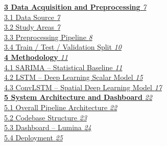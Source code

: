 \documentclass[12pt,a4paper]{report}
\begin{document}
\hyperlink{sec:ch3}{\textbf{3 \hspace{0.3cm} Data Acquisition and Preprocessing} \dotfill \textit{7}}\\
\hspace*{0.8cm}\hyperlink{sec:s31}{3.1 \hspace{0.3cm} Data Source \dotfill \textit{7}}\\
\hspace*{0.8cm}\hyperlink{sec:s32}{3.2 \hspace{0.3cm} Study Areas \dotfill \textit{7}}\\
\hspace*{0.8cm}\hyperlink{sec:s33}{3.3 \hspace{0.3cm} Preprocessing Pipeline \dotfill \textit{8}}\\
\hspace*{0.8cm}\hyperlink{sec:s34}{3.4 \hspace{0.3cm} Train / Test / Validation Split \dotfill \textit{10}}\\[0.3cm]

\hyperlink{sec:ch4}{\textbf{4 \hspace{0.3cm} Methodology} \dotfill \textit{11}}\\
\hspace*{0.8cm}\hyperlink{sec:s41}{4.1 \hspace{0.3cm} SARIMA -- Statistical Baseline \dotfill \textit{11}}\\
\hspace*{0.8cm}\hyperlink{sec:s42}{4.2 \hspace{0.3cm} LSTM -- Deep Learning Scalar Model \dotfill \textit{15}}\\
\hspace*{0.8cm}\hyperlink{sec:s43}{4.3 \hspace{0.3cm} ConvLSTM -- Spatial Deep Learning Model \dotfill \textit{17}}\\[0.3cm]

\hyperlink{sec:ch5}{\textbf{5 \hspace{0.3cm} System Architecture and Dashboard} \dotfill \textit{22}}\\
\hspace*{0.8cm}\hyperlink{sec:s51}{5.1 \hspace{0.3cm} Overall Pipeline Architecture \dotfill \textit{22}}\\
\hspace*{0.8cm}\hyperlink{sec:s52}{5.2 \hspace{0.3cm} Codebase Structure \dotfill \textit{23}}\\
\hspace*{0.8cm}\hyperlink{sec:s53}{5.3 \hspace{0.3cm} Dashboard -- Lumina \dotfill \textit{24}}\\
\hspace*{0.8cm}\hyperlink{sec:s54}{5.4 \hspace{0.3cm} Deployment \dotfill \textit{25}}\\[0.3cm]
\end{document}

